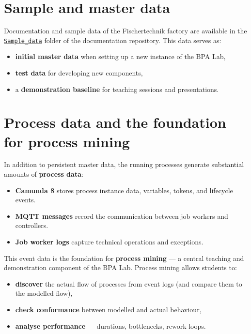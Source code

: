 \documentclass[
  english,
  11pt,
  a4paper,
]{scrbook}
\providecommand{\tightlist}{%
  \setlength{\itemsep}{0pt}\setlength{\parskip}{0pt}}
\begin{document}
\section{Sample and master data}\label{sample-and-master-data}

Documentation and sample data of the Fischertechnik factory are
available in the
\href{https://github.com/BpaLabTHCologne/bpa_lab_docs/tree/main/Sample_data}{\texttt{Sample\_data}}
folder of the documentation repository. This data serves as:

\begin{itemize}
\tightlist
\item
  \textbf{initial master data} when setting up a new instance of the BPA
  Lab,
\item
  \textbf{test data} for developing new components,
\item
  a \textbf{demonstration baseline} for teaching sessions and
  presentations.
\end{itemize}

\section{Process data and the foundation for process
mining}\label{process-data-and-the-foundation-for-process-mining}

In addition to persistent master data, the running processes generate
substantial amounts of \textbf{process data}:

\begin{itemize}
\tightlist
\item
  \textbf{Camunda 8} stores process instance data, variables, tokens,
  and lifecycle events.
\item
  \textbf{MQTT messages} record the communication between job workers
  and controllers.
\item
  \textbf{Job worker logs} capture technical operations and exceptions.
\end{itemize}

This event data is the foundation for \textbf{process mining} --- a
central teaching and demonstration component of the BPA Lab. Process
mining allows students to:

\begin{itemize}
\tightlist
\item
  \textbf{discover} the actual flow of processes from event logs (and
  compare them to the modelled flow),
\item
  \textbf{check conformance} between modelled and actual behaviour,
\item
  \textbf{analyse performance} --- durations, bottlenecks, rework loops.
\end{itemize}
\end{document}
